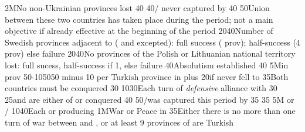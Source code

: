 %
\EUobjective2M{No non-Ukrainian provinces lost}{}%
{}{40}{}%
%
%
{}{40}{\provinceOsterreich/ never captured by
  }%
%
%
{}{40}{}%
%
%
%
{}{50}{Union between these two countries has taken place during the period;
  not a main objective if already effective at the beginning of the period}%
%
%
%
{20}{40}{Number of Swedish provinces adjacent to \regionBaltique (\regionSuede
  and \regionFinlande excepted): full success ( prov);
  half-success (4 prov) else failure}%
%
%
{20}{40}{No provinces of the Polish or Lithuanian national territory lost:
  full sucess, half-success if 1, else failure}%
%
%
{}{40}{Absolutism established}%
%
%
{}{40}{}%
%
\EUobjective5M{\TUR in \payshongrie}{prov}%
{50-10}{50}{50 \VPs minus 10 \VPs per Turkish province in \payshongrie plus
  20\VPs if \villeVienne never fell to \TUR}%
%
 
%
%
{}{35}{Both countries must be conquered}%
%
%
{}{30}{}%
%
%
{10}{30}{Each turn of \emph{defensive} alliance with \paysmajeurFrance}%
%
%
{}{30}{}%
%
%
{}{25}{\paysvalachie and \paysmoldavie are either \VASSAL of \TUR or
  conquered}%
%
%
%
{}{40}{}%
%
%
{}{50}{\provinceOsterreich/\villeVienne was captured this period by \TUR}%
%
%
{}{35}{}%
%
%
{}{35}{}%
%
\EUobjective5M{ or }{\COL/\TP}%
{10}{40}{Each \COL or \TP producing \POSPICE}%
%
%
\EUobjective1M{War or Peace in \payshongrie}{}%
{}{35}{Either there is no more than one turn of war between \AUSaus and \TUR,
  or at least 9 provinces of \payshongrie are Turkish}%
